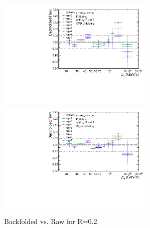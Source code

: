\begin{figure}
    \centering
    \begin{multicols}{2}
        \includegraphics[width=7.5cm]{figures/pPbFigures/UnfoldingComparisons/BackfoldedVsRaw/RatioFoldRawSvd_R02.pdf}
    \vfill\null
    \columnbreak
        \includegraphics[width=7.5cm]{figures/pPbFigures/UnfoldingComparisons/BackfoldedVsRaw/RatioFoldRawBayes_R02.pdf}
        \vfill\null
    \end{multicols}
    \caption{Backfolded vs. Raw for R=0.2.}
    \label{fig:BackfoldedRawpPb}
\end{figure}


